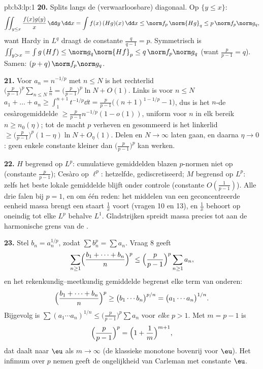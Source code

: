 \begin{solution}{pb:b3:lp:1}
\textbf{20.} Splits langs de (verwaarloosbare) diagonaal. Op $\{y
\leq x\}$:
\[
\iint_{y\leq x}\frac{f(x)g(y)}{x}\,\dd y\,\dd x
= \int f(x)\,(Hg)(x)\,\dd x \leq \norm f_p\,\norm{Hg}_q
\leq p\,\norm f_p\norm g_q,
\]
want Hardy in $L^q$ draagt de constante $\frac q{q-1} = p$.
Symmetrisch is $\iint_{y>x} = \int g\,(Hf) \leq \norm
g_q\norm{Hf}_p \leq q\,\norm f_p\norm g_q$ (want $\frac p{p-1} =
q$). Samen: $(p + q)\,\norm f_p\norm g_q$.

\textbf{21.} Voor $a_n = n^{-1/p}$ met $n \leq N$ is het
rechterlid $\bigl(\frac p{p-1}\bigr)^p\sum_{n\leq N}\frac1n =
\bigl(\frac p{p-1}\bigr)^p\ln N + O(1)$. Links is voor $n \leq N$
$a_1 + \dots + a_n \geq \int_1^{n+1}t^{-1/p}\dd t =
\frac{p}{p-1}\bigl((n+1)^{1-1/p} - 1\bigr)$, dus is het $n$-de
cesàrogemiddelde $\geq \frac p{p-1}n^{-1/p}(1 - o(1))$, uniform
voor $n$ in elk bereik $n \geq n_0(\eta)$; tot de macht $p$
verheven en gesommeerd is het linkerlid $\geq \bigl(\frac
p{p-1}\bigr)^p(1 - \eta)\ln N + O_\eta(1)$. Delen en $N \to
\infty$ laten gaan, en daarna $\eta \to 0$: geen enkele constante
kleiner dan $\bigl(\frac p{p-1}\bigr)^p$ kan werken.

\textbf{22.} $H$ begrensd op $L^p$: cumulatieve gemiddelden
blazen $p$-normen niet op (constante $\frac p{p-1}$); Cesàro op
$\ell^p$: hetzelfde, gediscretiseerd; $M$ begrensd op $L^p$:
zelfs het beste lokale gemiddelde blijft onder controle
(constante $O(\frac1{p-1})$). Alle drie falen bij $p = 1$, en om
één reden: het middelen van een geconcentreerde eenheid massa
brengt een staart $\frac1x$ voort (vragen 10 en 13), en $\frac1x$
behoort op oneindig tot elke $L^p$ behalve $L^1$. Gladstrijken
spreidt massa precies tot aan de harmonische grens van de
.

\textbf{23.} Stel $b_n = a_n^{1/p}$, zodat $\sum b_n^p = \sum
a_n$. Vraag 8 geeft
\[
\sum_{n\geq1}\Bigl(\frac{b_1 + \dots + b_n}n\Bigr)^{p}
\leq \Bigl(\frac p{p-1}\Bigr)^{p}\sum_{n\geq1}a_n,
\]
en het rekenkundig--meetkundig gemiddelde begrenst elke term van
onderen:
\[
\Bigl(\frac{b_1 + \dots + b_n}n\Bigr)^{p}
\geq \bigl(b_1\cdots b_n\bigr)^{p/n}
= \bigl(a_1\cdots a_n\bigr)^{1/n}.
\]
Bijgevolg is $\sum(a_1\cdots a_n)^{1/n} \leq \bigl(\frac
p{p-1}\bigr)^p\sum a_n$ voor \emph{elke} $p > 1$. Met $m = p - 1$
is
\[
\Bigl(\frac p{p-1}\Bigr)^{p} =
\Bigl(1 + \frac1m\Bigr)^{m+1},
\]
dat daalt naar $\eu$ als $m \to \infty$ (de klassieke monotone
bovenrij voor $\eu$). Het infimum over $p$ nemen geeft de
ongelijkheid van Carleman met constante $\eu$.


\end{solution}
